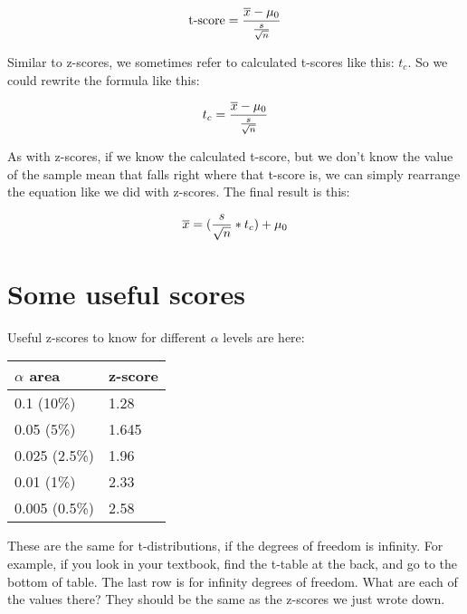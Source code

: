 \documentclass[../../../main.tex]{subfiles}
\begin{document}
\begin{equation*}
  \text{t-score} = \frac{\samplemean{x} - \HypPopMean/}{\frac{\samplestdev}{\sqrt{\samplesize/}}}
\end{equation*}

\noindent
Similar to z-scores, we sometimes refer to calculated t-scores like this: $t_{c}$. So we could rewrite the formula like this:

\begin{equation*}
  t_{c} = \frac{\samplemean{x} - \HypPopMean/}{\frac{\samplestdev}{\sqrt{\samplesize/}}}
\end{equation*}

\noindent
As with z-scores, if we know the calculated t-score, but we don't know the value of the sample mean that falls right where that t-score is, we can simply rearrange the equation like we did with z-scores. The final result is this:

\begin{equation*}
  \samplemean{x} = (\frac{\samplestdev}{\sqrt{\samplesize/}} * t_{c}) + \HypPopMean/
\end{equation*}


\section{Some useful scores}

Useful z-scores to know for different $\alpha$ levels are here:

\begin{center}
  \begin{tabular}{| l | l |}
    \hline
    \textbf{$\alpha$ area} & \textbf{z-score} \\ \hline
    0.1 (10\%) & 1.28 \\ \hline
    0.05 (5\%) & 1.645 \\ \hline
    0.025 (2.5\%) & 1.96 \\ \hline
    0.01 (1\%) & 2.33 \\ \hline
    0.005 (0.5\%) & 2.58 \\ \hline
  \end{tabular}
\end{center}

\noindent
These are the same for t-distributions, if the degrees of freedom is infinity. For example, if you look in your textbook, find the t-table at the back, and go to the bottom of table. The last row is for infinity degrees of freedom. What are each of the values there? They should be the same as the z-scores we just wrote down. 
\end{document}
